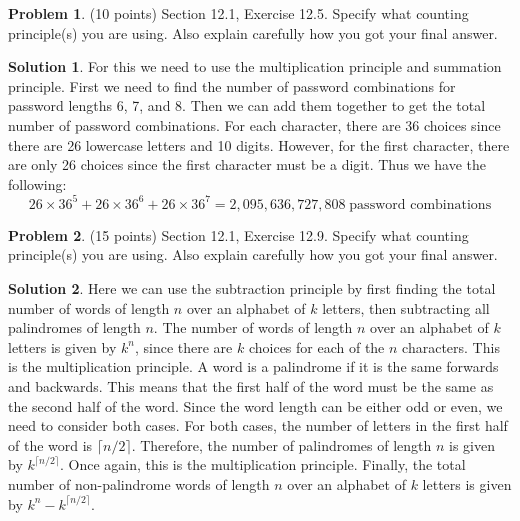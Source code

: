 \documentclass{article}
\theoremstyle{definition}
\newtheorem{problem}{Problem}
\newtheorem*{solution}{Solution}
\begin{document}
\newpage
\begin{problem} (10 points) Section 12.1, Exercise 12.5.  Specify what counting principle(s)
you are using.  Also explain carefully how you got your final answer.
\end{problem}
\begin{solution}
For this we need to use the multiplication principle and summation principle.
First we need to find the number of password combinations for password lengths 6, 7, and 8.
Then we can add them together to get the total number of password combinations.
For each character, there are 36 choices since there are 26 lowercase letters and 10 digits.
However, for the first character, there are only 26 choices since the first character must be a digit.
Thus we have the following:
$$ 26 \times 36^5 + 26 \times 36^6 + 26 \times 36^7 = 2,095,636,727,808 \; \text{password combinations} $$
\end{solution}

\newpage
\begin{problem} (15 points) Section 12.1, Exercise 12.9.  Specify what counting principle(s)
you are using.  Also explain carefully how you got your final answer.
\end{problem}
\begin{solution}
Here we can use the subtraction principle by first finding the total number of words of length $n$ over an alphabet of $k$ letters, 
then subtracting all palindromes of length $n$.
The number of words of length $n$ over an alphabet of $k$ letters is given by $k^n$,
since there are $k$ choices for each of the $n$ characters.
This is the multiplication principle.
A word is a palindrome if it is the same forwards and backwards.
This means that the first half of the word must be the same as the second half of the word.
Since the word length can be either odd or even, we need to consider both cases.
For both cases, the number of letters in the first half of the word is $\lceil n/2 \rceil$.
Therefore, the number of palindromes of length $n$ is given by $k^{\lceil n/2 \rceil}$.
Once again, this is the multiplication principle.
Finally, the total number of non-palindrome words of length $n$ over an alphabet of $k$ letters is given by $k^n - k^{\lceil n/2 \rceil}$.
\end{solution}
\end{document}
